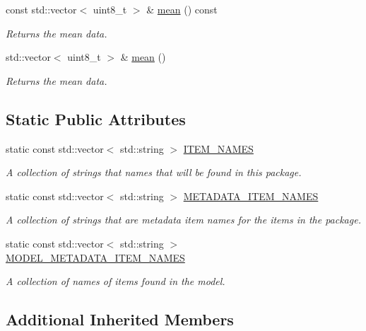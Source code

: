 \begin{DoxyCompactItemize}
const std\+::vector$<$ uint8\+\_\+t $>$ \& \hyperlink{group___classification_module_gaf96a25edff440f66fe6faba94ff1af66}{mean} () const 
\begin{DoxyCompactList}\small\item\em Returns the mean data. \end{DoxyCompactList}\item 
std\+::vector$<$ uint8\+\_\+t $>$ \& \hyperlink{group___classification_module_ga992d98f0f066f15edc2dfb40c03a3a88}{mean} ()
\begin{DoxyCompactList}\small\item\em Returns the mean data. \end{DoxyCompactList}\end{DoxyCompactItemize}
\subsection*{Static Public Attributes}
\begin{DoxyCompactItemize}
\item 
static const std\+::vector$<$ std\+::string $>$ \hyperlink{group___classification_module_ga44a441d13d149f42cc659ee92e83fdb4}{I\+T\+E\+M\+\_\+\+N\+A\+M\+ES}
\begin{DoxyCompactList}\small\item\em A collection of strings that names that will be found in this package. \end{DoxyCompactList}\item 
static const std\+::vector$<$ std\+::string $>$ \hyperlink{group___classification_module_ga0d8174bf9f1ba89932caa3abb73aa4cb}{M\+E\+T\+A\+D\+A\+T\+A\+\_\+\+I\+T\+E\+M\+\_\+\+N\+A\+M\+ES}
\begin{DoxyCompactList}\small\item\em A collection of strings that are metadata item names for the items in the package. \end{DoxyCompactList}\item 
static const std\+::vector$<$ std\+::string $>$ \hyperlink{group___classification_module_ga66d66cfd2c51d9d01f001fc6d55afcaf}{M\+O\+D\+E\+L\+\_\+\+M\+E\+T\+A\+D\+A\+T\+A\+\_\+\+I\+T\+E\+M\+\_\+\+N\+A\+M\+ES}
\begin{DoxyCompactList}\small\item\em A collection of names of items found in the model. \end{DoxyCompactList}\end{DoxyCompactItemize}
\subsection*{Additional Inherited Members}


